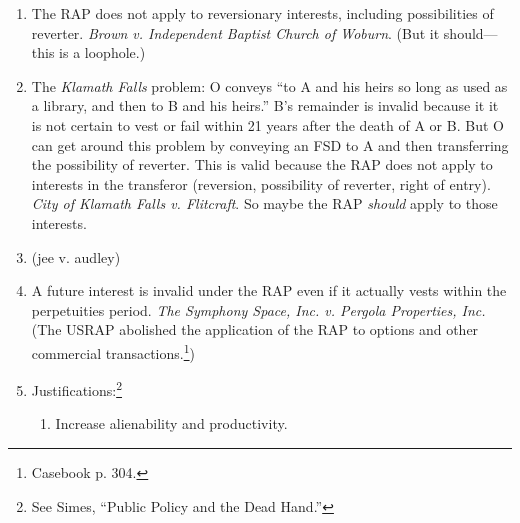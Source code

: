\begin{enumerate}
\begin{enumerate}
\begin{enumerate}
\begin{enumerate}
                vest prior to A's life plus 21 years. Since you can prove that 
                the interest must vest within this period, the remainder is 
                valid.\footnote{Casebook pp. 286--87.}
                \item Invalid: O transfers land ``in trust to A for life, then 
                to A's first child to reach 25.'' The interest will not 
                necessarily vest before after A's life plus 21 years. Thus, 
                the remainder is invalid.
                \item Invalid: to A and his heirs so long as used for school 
                purposes, and then to B and his heirs. The interest will not 
                necessarily vest or terminate within A or B's lifetimes.
            \end{enumerate}
            \item The RAP does not apply to reversionary interests, including 
            possibilities of reverter. \emph{Brown v. Independent Baptist 
            Church of Woburn}. (But it should---this is a loophole.)
            \item The \emph{Klamath Falls} problem: O conveys ``to A and his 
            heirs so long as used as a library, and then to B and his heirs.'' 
            B's remainder is invalid because it it is not certain to vest or 
            fail within 21 years after the death of A or B. But O can get 
            around this problem by conveying an FSD to A and then transferring 
            the possibility of reverter. This is valid because the RAP does 
            not apply to interests in the transferor (reversion, possibility 
            of reverter, right of entry). \emph{City of Klamath 
            Falls v. Flitcraft}. So maybe the RAP \emph{should} apply to those 
            interests.
            \item (jee v. audley) %
            \item A future interest is invalid under the RAP even if it 
            actually vests within the perpetuities period. \emph{The Symphony 
            Space, Inc. v. Pergola Properties, Inc.} (The USRAP abolished the 
            application of the RAP to options and other commercial 
            transactions.\footnote{Casebook p. 304.})
            \item Justifications:\footnote{See Simes, ``Public Policy and the 
            Dead Hand.''}
            \begin{enumerate}
                \item Increase alienability and productivity.

\end{enumerate}
\end{enumerate}
\end{enumerate}
\end{enumerate}
